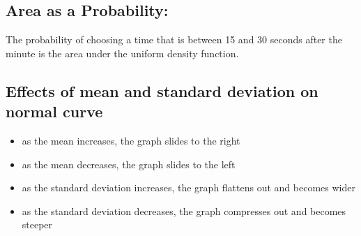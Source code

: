 \documentclass{report}
\begin{document}
      \subsection*{Area as a Probability:}
      \bigbreak \noindent 
      The probability of choosing a time that is between 15 and 30 seconds after the minute is the area under the uniform density function.
      \bigbreak \noindent 
      \begin{figure}[ht]
          \centering
          \label{fig:figaro3}
      \end{figure}

      \bigbreak \noindent \bigbreak \noindent 
      \subsection*{Effects of mean and standard deviation on normal curve}
      \bigbreak \noindent 
      \begin{itemize}
        \item as the mean increases, the graph slides to the right
        \item as the mean decreases, the graph slides to the left
        \item as the standard deviation increases, the graph flattens out and becomes wider 
        \item as the standard deviation decreases, the graph compresses out and becomes steeper 
      \end{itemize}

\end{document}
